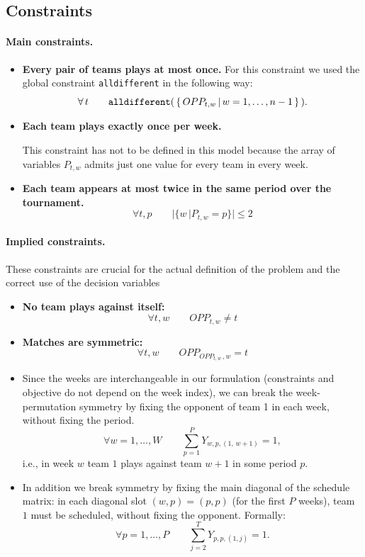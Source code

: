 \subsection{Constraints}


\paragraph{Main constraints.}
\begin{itemize}
\item[(C1)] \textbf{Every pair of teams plays at most once.}  
For this constraint we used the global constraint \verb|alldifferent| in the following way:
\[
\forall\, t \qquad \verb|alldifferent|(\,\{\,OPP_{t,w}\,|\, w = 1,\dots, n-1\,\}\,).
\]

\item[(C2)] \textbf{Each team plays exactly once per week.}  

This constraint has not to be defined in this model because the array of variables $P_{t,w}$ admits just one value for every team in every week.

\item[(C3)] \textbf{Each team appears at most twice in the same period over the tournament.}  
\[
\forall t, p \qquad \big|\{w\,| P_{t,w}=p\}\big| \leq 2
\]
\end{itemize}


\paragraph{Implied constraints.}
These constraints are crucial for the actual definition of the problem and the correct use of the decision variables
\begin{itemize}
\item[(C4)] \textbf{No team plays against itself:}
\[
\forall t , w \qquad OPP_{t,w} \neq t
\]

\item[(C5)] \textbf{Matches are symmetric:}
\[
\forall t , w \qquad OPP_{OPP_{t,w}\,, w} = t
\]

\item[(C6)] Since the weeks are interchangeable in our formulation (constraints and objective do not depend on the week index), we can break the week-permutation symmetry by fixing the opponent of team 1 in each week, without fixing the period.
\[
\forall w = 1,\dots,W \qquad \sum_{p = 1}^P Y_{w,p,(1,\,w+1)} = 1,
\]
i.e., in week \(w\) team \(1\) plays against team \(w+1\) in some period \(p\).

\item[(C7)] In addition we break symmetry by fixing the main diagonal of the schedule matrix: in each diagonal slot \((w,p)=(p,p)\) (for the first \(P\) weeks), team \(1\) must be scheduled, without fixing the opponent. Formally:
\[
\forall p = 1,\dots,P \qquad
\sum_{j=2}^{T} Y_{p,p,(1,j)} = 1.
\]

\end{itemize}


